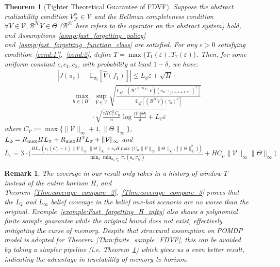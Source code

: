\documentclass[twoside]{article}
\newtheorem{theorem}{Theorem}
\newtheorem{remark}{Remark}
\newcommand{\CAL}[1]{\mathcal{#1}}
\newcommand{\yplu}[1]{{\color{orange}{ [\textbf{Yiping:}} #1]}}
\begin{document}
\begin{theorem}[Tighter Theoretical Guarantee of FDVF]\label{Thm:tighter_fdvf_guarantee}
Suppose the abstract realizability condition $V_\CAL{F}^\phi \in \CAL{V}$ and the Bellman completeness condition $\forall V \in \CAL{V}, \CAL{B^H}V \in \Theta$ ($\CAL{B^H}$ here refers to the operator on the abstract system) hold, and Assumptions~\ref{asmp:fast_forgetting_policy} and~\ref{asmp:fast_forgetting_function_class} are satisfied. For any $\varepsilon > 0$ satisfying condition~\ref{cond:1'},~\ref{cond:2}, define $T=\max\{T_1(\varepsilon),T_2(\varepsilon)\}$.
Then, for some uniform constant $c,c_1,c_2$, with probability at least $1 - \delta$, we have: 
\begin{align*}
&|J(\pi_e)-\mathbb{E}_{\pi_b}[\hat{V}(f_1)]|\leq L_\phi\varepsilon+\sqrt{H} \cdot \\&\textstyle\qquad\max_{h\in[H]}\sup_{V\in\CAL{V}}\sqrt{\frac{\mathbb{E}_{\pi_e^\phi}[(\CAL{B}^{(\CAL{S},\CAL{H}_T)}V)(s_h,\tau_{[h-T+1:h]})^2]}{\mathbb{E}_{\pi_b^\phi}[(\CAL{B^H}V)(\tau_h)^2]}}\nonumber\\&\textstyle\qquad\qquad\quad\cdot\sqrt{\frac{cHC_{\CAL{V}}^2C_\mu}{n}\log\frac{|\CAL{V}||{\Theta}|}{\delta}+L_{\CAL{E}}\varepsilon} 
\end{align*}
where $C_{\CAL{V}}:=\max\{\|\CAL{V}\|_\infty+1,\|\Theta\|_\infty\}$, $L_\phi={R_{\rm max}HL_\pi}+{ R_{\rm max}}H^2L_\pi+\|\CAL{V}\|_\infty$ and $L_\varepsilon=3\cdot\allowbreak{}\big(\frac{HL_\pi({c_1(C_\mu+1)\|\CAL{V}\|_\infty\|\Theta\|_\infty}+{c_2H\max\{C_\mu\|\CAL{V}\|_\infty\|\Theta\|_\infty, \frac{1}{2}\|\Theta\|_\infty^2\}})}{\min_h\min_{a_h,\tau_h^+}\pi_b(a_h|\tau_h^+)}\allowbreak{}+HC_\mu\|\CAL{V}\|_\infty\|\Theta\|_\infty\big)$ 
\end{theorem}
\begin{remark}
    The coverage in our result only takes in a history of window $T$ instead of the entire horizon $H$, and Theorem~\ref{Thm:coverage_compare_2},~\ref{Thm:coverage_compare_3} proves that the $L_2$ and $L_\infty$ belief coverage in the belief one-hot scenario are no worse than the original. Example~\ref{example:Fast_forgetting_H_infty} also shows a polynomial finite sample guarantee while the original bound does not exist, effectively mitigating the curse of memory. Despite that structural assumption on POMDP model is adopted for Theorem~\ref{Thm:finite_sample_FDVF}, this can be avoided by taking a simpler pipeline (i.e. Theorem~\ref{Thm:tighter_fdvf_guarantee}) which gives us a even better result, indicating the advantage in tractability of memory to horizon.
\end{remark}
\end{document}
